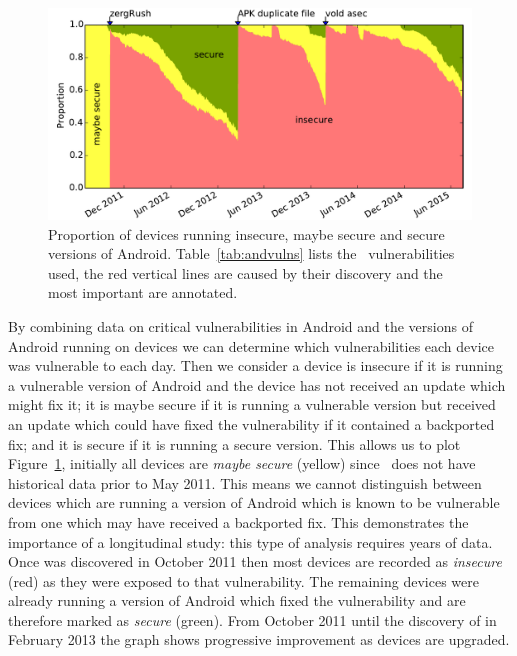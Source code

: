 \begin{figure}
\centering
\includegraphics[width=\columnwidth]{figures/proportioninsecure}
\caption{Proportion of devices running insecure, maybe secure and secure versions of Android.
Table~\ref{tab:andvulns} lists the \daNumVulnsUsed\ vulnerabilities used, the red vertical lines are caused by their discovery and the most important are annotated.}
\label{fig:proportioninsecure}
\end{figure}
By combining data on critical vulnerabilities in Android and the versions of Android running on devices we can determine which vulnerabilities each device was vulnerable to each day.
Then we consider a device is insecure if it is running a vulnerable version of Android and the device has not received an update which might fix it;
it is maybe secure if it is running a vulnerable version but received an update which could have fixed the vulnerability if it contained a backported fix;
and it is secure if it is running a secure version.
This allows us to plot Figure~\ref{fig:proportioninsecure}, initially all devices are \emph{maybe secure} (yellow) since \da\ does not have historical data prior to May 2011.
This means we cannot distinguish between devices which are running a version of Android which is known to be vulnerable from one which may have received a backported fix.
This demonstrates the importance of a longitudinal study: this type of analysis requires years of data.
Once  was discovered in October 2011 then most devices are recorded as \emph{insecure} (red) as they were exposed to that vulnerability.
The remaining devices were already running a version of Android which fixed the  vulnerability and are therefore marked as \emph{secure} (green).
From October 2011 until the discovery of  in February 2013 the graph shows progressive improvement as devices are upgraded.
